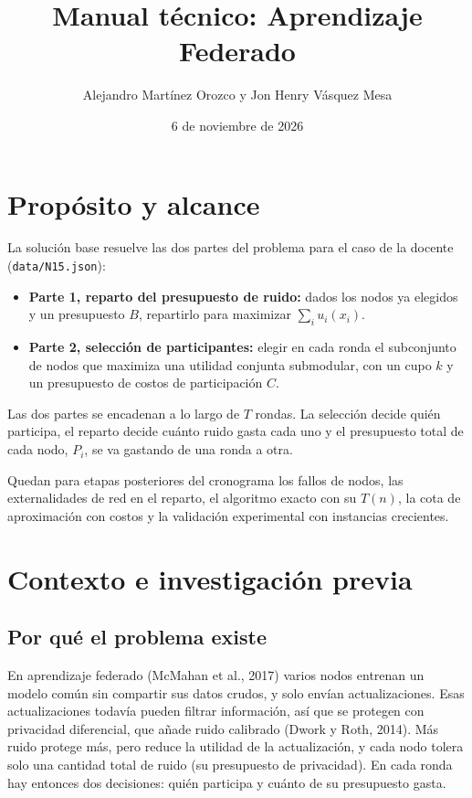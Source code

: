 \documentclass[11pt,a4paper]{article}
\title{Manual técnico: Aprendizaje Federado}
\author{Alejandro Martínez Orozco y Jon Henry Vásquez Mesa}
\affil{Análisis y Diseño de Algoritmos $\cdot$ Grupo 2}
\affil{Universidad de Caldas}
\date{6 de noviembre de 2026}
\begin{document}
\maketitle

\tableofcontents
\newpage

\section{Propósito y alcance}

La solución base resuelve las dos partes del problema para el caso de la
docente (\texttt{data/N15.json}):

\begin{itemize}[leftmargin=*,label=$\bullet$]
  \item \textbf{Parte 1, reparto del presupuesto de ruido:} dados los nodos ya
  elegidos y un presupuesto $B$, repartirlo para maximizar
  $\sum_i u_i(x_i)$.
  \item \textbf{Parte 2, selección de participantes:} elegir en cada ronda el
  subconjunto de nodos que maximiza una utilidad conjunta submodular, con un
  cupo $k$ y un presupuesto de costos de participación $C$.
\end{itemize}

Las dos partes se encadenan a lo largo de $T$ rondas. La selección decide quién
participa, el reparto decide cuánto ruido gasta cada uno y el presupuesto total
de cada nodo, $P_i$, se va gastando de una ronda a otra.

Quedan para etapas posteriores del cronograma los fallos de nodos, las
externalidades de red en el reparto, el algoritmo exacto con su $T(n)$, la cota
de aproximación con costos y la validación experimental con instancias
crecientes.

\section{Contexto e investigación previa}

\subsection{Por qué el problema existe}

En aprendizaje federado (McMahan et al., 2017) varios nodos entrenan un modelo
común sin compartir sus datos crudos, y solo envían actualizaciones. Esas
actualizaciones todavía pueden filtrar información, así que se protegen con
privacidad diferencial, que añade ruido calibrado (Dwork y Roth, 2014). Más
ruido protege más, pero reduce la utilidad de la actualización, y cada nodo
tolera solo una cantidad total de ruido (su presupuesto de privacidad). En cada
ronda hay entonces dos decisiones: quién participa y cuánto de su presupuesto
gasta.
\end{document}
